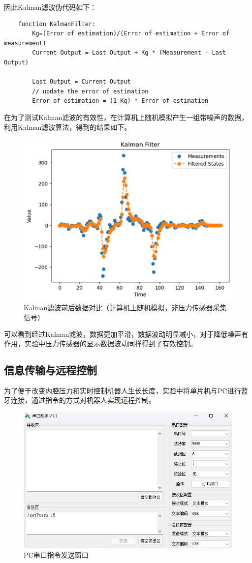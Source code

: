\documentclass[11pt, a4paper, oneside]{ctexart}
\begin{document}
因此Kalman滤波伪代码如下：
\begin{verbatim}
    function KalmanFilter:
        Kg=(Error of estimation)/(Error of estimation + Error of measurement)
        Current Output = Last Output + Kg * (Measurement - Last Output)

        Last Output = Current Output
        // update the error of estimation
        Error of estimation = (1-Kg) * Error of estimation
\end{verbatim}

在为了测试Kalman滤波的有效性，在计算机上随机模拟产生一组带噪声的数据，利用Kalman滤波算法，得到的结果如下。
\begin{figure}[H]
    \centering
    \includegraphics[scale=0.3]{Kalman}
    \caption{Kalman滤波前后数据对比（计算机上随机模拟，非压力传感器采集信号）}
    \label{Kalman}
\end{figure}
可以看到经过Kalman滤波，数据更加平滑，数据波动明显减小，对于降低噪声有作用，实验中压力传感器的显示数据波动同样得到了有效控制。
\subsection{信息传输与远程控制}
为了便于改变内腔压力和实时控制机器人生长长度，实验中将单片机与PC进行蓝牙连接，通过指令的方式对机器人实现远程控制。
\begin{figure}[H]
    \centering
    \includegraphics[scale=0.5]{操作}
    \caption{PC串口指令发送窗口}
    \label{操作}
\end{figure}
\end{document}
